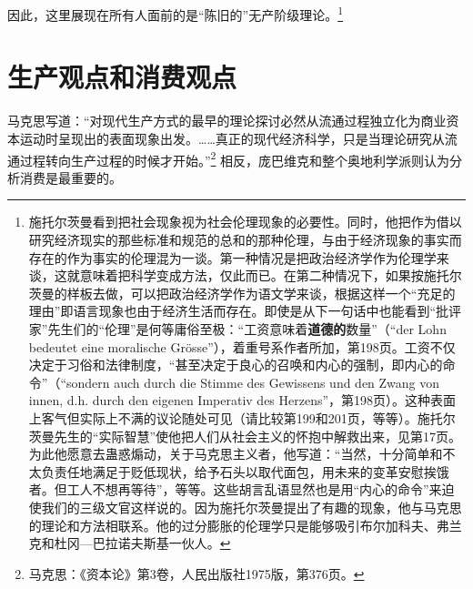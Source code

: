 \documentclass[fontset=fandol, a4paper, 12pt, openright]{ctexbook}
\begin{document}
因此，这里展现在所有人面前的是“陈旧的”无产阶级理论。\footnote{施托尔茨曼看到把社会现象视为社会伦理现象的必要性。同时，他把作为借以研究经济现实的那些标准和规范的总和的那种伦理，与由于经济现象的事实而存在的作为事实的伦理混为一谈。第一种情况是把政治经济学作为伦理学来谈，这就意味着把科学变成方法，仅此而已。在第二种情况下，如果按施托尔茨曼的样板去做，可以把政治经济学作为语文学来谈，根据这样一个“充足的理由”即语言现象也由于经济生活而存在。即使是从下一句话中也能看到“批评家”先生们的“伦理”是何等庸俗至极：“工资意味着\textbf{道德的}数量”（“der Lohn bedeutet eine moralische Gr\"{o}sse”），着重号系作者所加，第198页。工资不仅决定于习俗和法律制度，“甚至决定于良心的召唤和内心的强制，即内心的命令”（“sondern auch durch die Stimme des Gewissens und den Zwang von innen, d.h. durch den eigenen Imperativ des Herzens”，第198页）。这种表面上客气但实际上不满的议论随处可见（请比较第199和201页，等等）。施托尔茨曼先生的“实际智慧”使他把人们从社会主义的怀抱中解救出来，见第17页。为此他愿意去蛊惑煽动，关于马克思主义者，他写道：“当然，十分简单和不太负责任地满足于贬低现状，给予石头以取代面包，用未来的变革安慰挨饿者。但工人不想再等待”，等等。这些胡言乱语显然也是用“内心的命令”来迫使我们的三级文官这样说的。因为施托尔茨曼提出了有趣的现象，他与马克思的理论和方法相联系。他的过分膨胀的伦理学只是能够吸引布尔加科夫、弗兰克和杜冈—巴拉诺夫斯基一伙人。}

\section{生产观点和消费观点}

马克思写道：“对现代生产方式的最早的理论探讨必然从流通过程独立化为商业资本运动时呈现出的表面现象出发。……真正的现代经济科学，只是当理论研究从流通过程转向生产过程的时候才开始。”\footnote{马克思：《资本论》第3卷，人民出版社1975版，第376页。} 相反，庞巴维克和整个奥地利学派则认为分析消费是最重要的。
\end{document}
